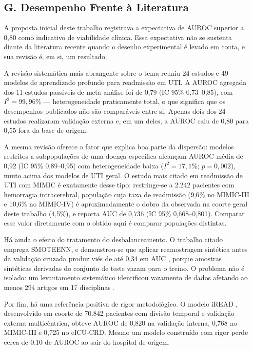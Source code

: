 \documentclass{ieeeaccess}
\begin{document}
\subsection*{G. Desempenho Frente à Literatura}
A proposta inicial deste trabalho registrava a expectativa de AUROC superior a 0,80 como indicativo de viabilidade clínica. Essa expectativa não se sustenta diante da literatura recente quando o desenho experimental é levado em conta, e sua revisão é, em si, um resultado.

A revisão sistemática mais abrangente sobre o tema \cite{Koumantakis2025} reuniu 24 estudos e 49 modelos de aprendizado profundo para readmissão em UTI. A AUROC agregada dos 11 estudos passíveis de meta-análise foi de 0,79 (IC 95\% 0,73--0,85), com $I^2 = 99{,}96\%$ --- heterogeneidade praticamente total, o que significa que os desempenhos publicados não são comparáveis entre si. Apenas dois dos 24 estudos realizaram validação externa e, em um deles, a AUROC caiu de 0,80 para 0,55 fora da base de origem.

A mesma revisão oferece o fator que explica boa parte da dispersão: modelos restritos a subpopulações de uma doença específica alcançam AUROC média de 0,92 (IC 95\% 0,89--0,95) com heterogeneidade baixa ($I^2 = 17{,}1\%$; $p = 0{,}002$), muito acima dos modelos de UTI geral. O estudo mais citado em readmissão de UTI com MIMIC \cite{Miao2024} é exatamente desse tipo: restringe-se a 2.242 pacientes com hemorragia intracerebral, população cuja taxa de readmissão (9,6\% no MIMIC-III e 10,6\% no MIMIC-IV) é aproximadamente o dobro da observada na coorte geral deste trabalho (4,5\%), e reporta AUC de 0,736 (IC 95\% 0,668--0,801). Comparar esse valor diretamente com o obtido aqui é comparar populações distintas.

Há ainda o efeito do tratamento do desbalanceamento. O trabalho citado emprega SMOTEENN, e demonstrou-se que aplicar reamostragem sintética antes da validação cruzada produz viés de até 0,34 em AUC \cite{Demircioglu2024}, porque amostras sintéticas derivadas do conjunto de teste vazam para o treino. O problema não é isolado: um levantamento sistemático identificou vazamento de dados afetando ao menos 294 artigos em 17 disciplinas \cite{Kapoor2023}.

Por fim, há uma referência positiva de rigor metodológico. O modelo iREAD \cite{Lim2025}, desenvolvido em coorte de 70.842 pacientes com divisão temporal e validação externa multicêntrica, obteve AUROC de 0,820 na validação interna, 0,768 no MIMIC-III e 0,725 no eICU-CRD. Mesmo um modelo construído com rigor perde cerca de 0,10 de AUROC ao sair do hospital de origem.
\end{document}
